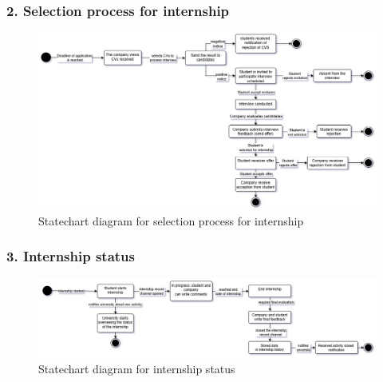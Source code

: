 \subsubsection{2. Selection process for internship}\label{subsubsec:internship_feedback}
\begin{figure}[H]
    \centering
    \includegraphics[width=1\textwidth]{Images/Selection_process.png}
    \caption{Statechart diagram for selection process for internship}\label{fig:statechart_selection_process_for_internship}
\end{figure}

\subsubsection{3. Internship status}\label{subsubsec:monitoring_student_activities}
\begin{figure}[H]
    \centering
    \includegraphics[width=1\textwidth]{Images/Internship_status.png}
    \caption{Statechart diagram for internship status}\label{fig:statechart_internship_status}
\end{figure}


